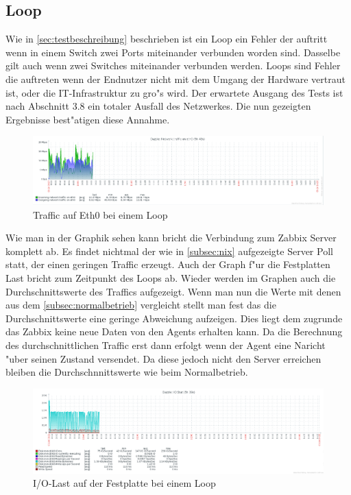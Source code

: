 \subsection{Loop}

\label{subsec:loop}
Wie in \cref{sec:testbeschreibung} beschrieben ist ein Loop ein Fehler der auftritt wenn in einem Switch zwei Ports miteinander verbunden worden sind. %
Dasselbe gilt auch wenn zwei Switches miteinander verbunden werden. Loops sind Fehler die auftreten wenn der Endnutzer nicht mit dem Umgang der Hardware vertraut ist, %
oder die IT-Infrastruktur zu gro"s wird. %
Der erwartete Ausgang des Tests ist nach Abschnitt 3.8 \autocite{book:schreiner} ein totaler Ausfall des Netzwerkes. Die nun gezeigten Ergebnisse best"atigen diese %
Annahme.  

\begin{figure}[htbp]
\centering
\includegraphics*[width=0.9\linewidth]{Abb/ZabbixDazzle/Loop/DazzleLoop}

\caption{Traffic auf Eth0 bei einem Loop}
\label{fig:Eth0DazzleLoop}
\end{figure}

Wie man in der Graphik sehen kann bricht die Verbindung zum Zabbix Server komplett ab. Es findet nichtmal der wie in \cref{subsec:nix} aufgezeigte Server Poll statt, %
der einen geringen Traffic erzeugt. %
Auch der Graph f"ur die Festplatten Last bricht zum Zeitpunkt des Loops ab. Wieder werden im Graphen auch die Durchschnittswerte des Traffics aufgezeigt. %
Wenn man nun die Werte mit denen aus dem \cref{subsec:normalbetrieb} vergleicht stellt man fest das die Durchschnittswerte eine geringe Abweichung aufzeigen. %
Dies liegt dem zugrunde das Zabbix keine neue Daten von den Agents erhalten kann. Da die Berechnung des durchschnittlichen Traffic erst dann erfolgt wenn %
der Agent eine Naricht "uber seinen Zustand versendet. Da diese jedoch nicht den Server erreichen bleiben die Durchschnnittswerte wie beim Normalbetrieb. %

\begin{figure}[htbp]
\centering
\includegraphics*[width=0.9\linewidth]{Abb/ZabbixDazzle/Loop/IoStatDazzleLoop}

\caption{I/O-Last auf der Festplatte bei einem Loop}
\label{fig:IoStatDazzleLoop}
\end{figure}

